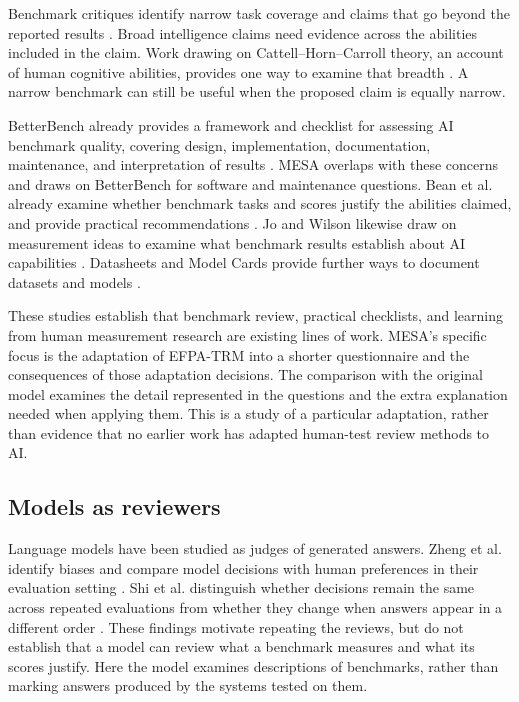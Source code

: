 \documentclass[10pt,conference]{IEEEtran}
\begin{document}
Benchmark critiques identify narrow task coverage and claims that go beyond the reported results \cite{line_goes_up,alonso_church_sigir}. Broad intelligence claims need evidence across the abilities included in the claim. Work drawing on Cattell--Horn--Carroll theory, an account of human cognitive abilities, provides one way to examine that breadth \cite{hendrycks_definition_agi}. A narrow benchmark can still be useful when the proposed claim is equally narrow.

BetterBench already provides a framework and checklist for assessing AI benchmark quality, covering design, implementation, documentation, maintenance, and interpretation of results \cite{reuel_betterbench}. MESA overlaps with these concerns and draws on BetterBench for software and maintenance questions. Bean et al. already examine whether benchmark tasks and scores justify the abilities claimed, and provide practical recommendations \cite{bean_measuring_what_matters}. Jo and Wilson likewise draw on measurement ideas to examine what benchmark results establish about AI capabilities \cite{jo_wilson_what_does_your_benchmark_measure}. Datasheets and Model Cards provide further ways to document datasets and models \cite{gebru_datasheets_2021,mitchell_model_cards_2019}.

These studies establish that benchmark review, practical checklists, and learning from human measurement research are existing lines of work. MESA's specific focus is the adaptation of EFPA-TRM into a shorter questionnaire and the consequences of those adaptation decisions. The comparison with the original model examines the detail represented in the questions and the extra explanation needed when applying them. This is a study of a particular adaptation, rather than evidence that no earlier work has adapted human-test review methods to AI.

\subsection{Models as reviewers}
Language models have been studied as judges of generated answers. Zheng et al. identify biases and compare model decisions with human preferences in their evaluation setting \cite{zheng_llm_judge_2023}. Shi et al. distinguish whether decisions remain the same across repeated evaluations from whether they change when answers appear in a different order \cite{shi_judging_judges_2025}. These findings motivate repeating the reviews, but do not establish that a model can review what a benchmark measures and what its scores justify. Here the model examines descriptions of benchmarks, rather than marking answers produced by the systems tested on them.
\end{document}
